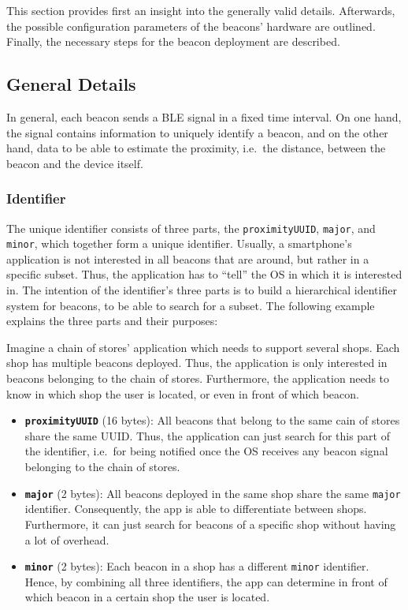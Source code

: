 This section provides first an insight into the generally valid details. Afterwards, the possible configuration parameters of the beacons' hardware are outlined. Finally, the necessary steps for the beacon deployment are described.

\subsection{General Details}
In general, each beacon sends a \acs{BLE} signal in a fixed time interval. On one hand, the signal contains information to uniquely identify a beacon, and on the other hand, data to be able to estimate the proximity, i.e.\ the distance, between the beacon and the device itself.

\subsubsection*{Identifier}
The unique identifier consists of three parts, the \texttt{proximityUUID}, \texttt{major}, and \texttt{minor}, which together form a unique identifier. Usually, a smartphone's application is not interested in all beacons that are around, but rather in a specific subset. Thus, the application has to ``tell'' the \ac{OS} in which it is interested in. The intention of the identifier's three parts is to build a hierarchical identifier system for beacons, to be able to search for a subset. The following example explains the three parts and their purposes:

Imagine a chain of stores' application which needs to support several shops. Each shop has multiple beacons deployed. Thus, the application is only interested in beacons belonging to the chain of stores. Furthermore, the application needs to know in which shop the user is located, or even in front of which beacon.

\begin{itemize}
  \item \textbf{\texttt{proximityUUID}} (16 bytes): All beacons that belong to the same cain of stores share the same \acl{UUID}. Thus, the application can just search for this part of the identifier, i.e.\ for being notified once the \ac{OS} receives any beacon signal belonging to the chain of stores.
  \item \textbf{\texttt{major}} (2 bytes): All beacons deployed in the same shop share the same \texttt{major} identifier. Consequently, the app is able to differentiate between shops. Furthermore, it can just search for beacons of a specific shop without having a lot of overhead.
  \item \textbf{\texttt{minor}} (2 bytes): Each beacon in a shop has a different \texttt{minor} identifier. Hence, by combining all three identifiers, the app can determine in front of which beacon in a certain shop the user is located.
\end{itemize}


